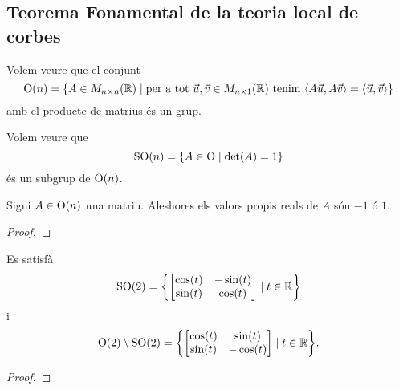 \documentclass[../Apunts.tex]{subfiles}
\begin{document}
	\subsection{Teorema Fonamental de la teoria local de corbes}
	\begin{example}
		\label{ex:grup ortogonal}
		Volem veure que el conjunt
		\[\GrupOrtogonal(n)=\{A\in\matrius_{n\times n}(\mathbb{R})\mid\text{per a tot }\vec{u},\vec{v}\in\matrius_{n\times1}(\mathbb{R})\text{ tenim }\prodesc{A\vec{u}}{A\vec{v}}=\prodesc{\vec{u}}{\vec{v}}\}\]
		amb el producte de matrius és un grup.
		\begin{solution}
		\end{solution}
	\end{example}
	\begin{example}
		\label{ex:grup especial ortogonal}
		Volem veure que
		\[\mathrm{SO}(n)=\{A\in\mathrm{O}\mid\det(A)=1\}\]
		és un subgrup de \(\mathrm{O}(n)\).
		\begin{solution}
		\end{solution}
	\end{example}
	\begin{proposition}
		\label{prop:els valors propis d'una matriu ortogonal són -1 o 1}
		Sigui \(A\in\mathrm{O}(n)\) una matriu. Aleshores els valors propis reals de \(A\) són \(-1\) ó \(1\).
		\begin{proof}
		\end{proof}
	\end{proposition}
	\begin{proposition}
		\label{prop:caracterització de les matrius ortogonals 2x2}
		Es satisfà
		\[\GrupEspecialOrtogonal(2)=\left\{\begin{bmatrix}
			\cos(t) & -\sin(t) \\
			\sin(t) & \cos(t)
		\end{bmatrix}\mid t\in\mathbb{R}\right\}\]
		i
		\[\GrupOrtogonal(2)\setminus\GrupEspecialOrtogonal(2)=\left\{\begin{bmatrix}
			\cos(t) & \sin(t) \\
			\sin(t) & -\cos(t)
		\end{bmatrix}\mid t\in\mathbb{R}\right\}.\]
		\begin{proof}
		\end{proof}
	\end{proposition}
\end{document}
